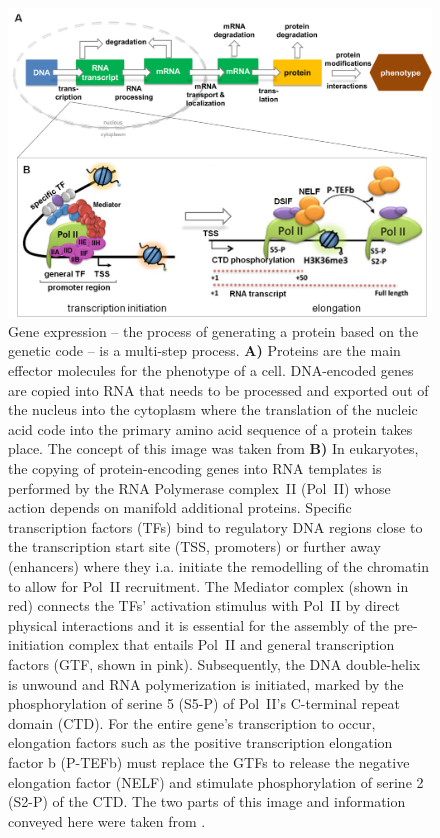 \begin{figure}[htb]
\includegraphics[width=1\textwidth,trim=2 0 2 2,clip]{Figures/CentralDogma.png}
\begin{footnotesize}
\caption[The multiple steps of gene expression in eukaryotes.]{\textsf{Gene expression -- the process of generating a protein based on the genetic code -- is a multi-step process.
\textbf{A)} Proteins are the main effector molecules for the phenotype of a cell. DNA-encoded genes are copied into RNA that needs to be processed and exported out of the nucleus into the cytoplasm where the translation of the nucleic acid code into the primary amino acid sequence of a protein takes place. The concept of this image was taken from \citet{Alberts2002}
\textbf{B)} In eukaryotes, the copying of protein-encoding genes into RNA templates is performed by the RNA Polymerase complex~II (Pol~II) whose action depends on manifold additional proteins. Specific transcription factors (TFs) bind to regulatory DNA regions close to the transcription start site (TSS, promoters) or further away (enhancers) where they i.a. initiate the remodelling of the chromatin to allow for Pol~II recruitment. The Mediator complex (shown in red) connects the TFs’ activation stimulus with Pol~II by direct physical interactions and it is essential for the assembly of the pre-initiation complex that entails Pol~II and general transcription factors (GTF, shown in pink). Subsequently, the DNA double-helix is unwound and RNA polymerization is initiated, marked by the phosphorylation of serine 5 (S5-P) of Pol~II’s C-terminal repeat domain (CTD). For the entire gene’s transcription to occur, elongation factors such as the positive transcription elongation factor b (P-TEFb) must replace the GTFs to release the negative elongation factor (NELF) and stimulate phosphorylation of serine 2 (S2-P) of the CTD. The two parts of this image and information conveyed here were taken from \citet{Barrero2013}.
}}
\label{fig:Expression}
\end{footnotesize}
\end{figure}

